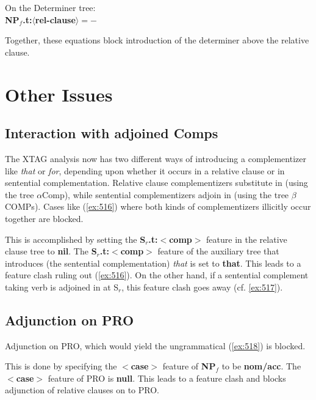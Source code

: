On the Determiner tree:\\ 
{\bf NP$_{f}$.t:$\langle$rel-clause$\rangle = -$} 
 
Together, these equations block 
introduction of the determiner above the relative clause. 
 
 
\section{Other Issues} 
 
\subsection{Interaction with adjoined Comps} 
The XTAG analysis now has two different ways of introducing a 
complementizer like {\em that} or {\em for}, depending upon whether 
it occurs in a relative clause or in sentential complementation. 
Relative clause complementizers substitute in (using the 
tree $\alpha$Comp), while sentential complementizers adjoin in 
(using the tree $\beta$COMPs). Cases like (\ref{ex:516}) where 
both kinds of complementizers illicitly occur together are blocked. 
 
\beginsentences
{}\label{ex:516} 
\endsentences

 
This is accomplished by setting the {\bf S$_{r}$.t:$<$comp$>$} feature 
in the relative clause tree to {\bf nil}. The {\bf S$_{r}$.t:$<$comp$>$} 
feature of the auxiliary tree that introduces 
(the sentential complementation) {\em that} is set to 
{\bf that}. This leads to a feature clash ruling out (\ref{ex:516}). On the 
other hand, if a sentential complement taking verb is adjoined 
in at S$_{r}$, this feature clash goes away (cf. \ref{ex:517}). 
 
\beginsentences
{}\label{ex:517} 
\endsentences

 
 
 
\subsection{Adjunction on PRO} 
Adjunction on PRO, which would yield the ungrammatical (\ref{ex:518}) is blocked. 
 
\beginsentences
{}\label{ex:518} 
\endsentences

This is done by specifying the {\bf $<$case$>$} feature of {\bf NP$_{f}$} to be 
{\bf nom/acc}. The {\bf $<$case$>$} feature of PRO is {\bf null}. This 
leads to a feature clash and blocks adjunction of relative clauses on to 
PRO. 
 
